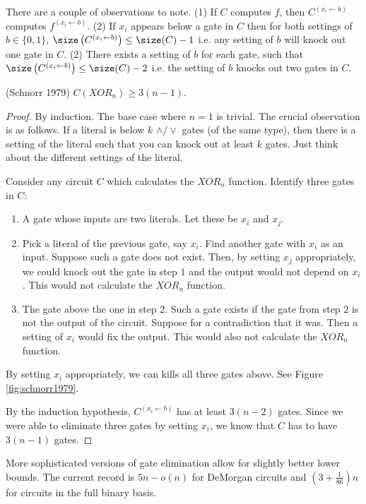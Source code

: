 There are a couple of observations to note. (1) If $C$ computes $f$, then $C^{(x_i \leftarrow b)}$ computes $f^{(x_i \leftarrow b)}$. (2) If $x_i$ appears below a gate in $C$ then for both settings of $b \in \{0,1\}$, $\size\left(C^{(x_i \leftarrow b)}\right) \leq \size(C) - 1$ i.e. any setting of $b$ will knock out one gate in $C$. (2) There exists a setting of $b$ for each gate, such that $\size\left(C^{(x_i \leftarrow b)}\right) \leq \size(C) - 2$ i.e. the setting of $b$ knocks out two gates in $C$.

\begin{theorem}
	\label{thm:schnorr1979-XORlb}
	(Schnorr 1979) $C(XOR_n) \geq 3(n-1)$.
\end{theorem}
\begin{proof}
	By induction. The base case where $n = 1$ is trivial. The crucial observation is as follows. If a literal is below $k$ $\land/\lor$ gates (of the same type), then there is a setting of the literal such that you can knock out at least $k$ gates. Just think about the different settings of the literal.
	
	Consider any circuit $C$ which calculates the $XOR_n$ function. Identify three gates in $C$:
	\begin{enumerate}
		\item A gate whose inputs are two literals. Let these be $x_i$ and $x_j$. 
		\item Pick a literal of the previous gate, say $x_i$. Find another gate with $x_i$ as an input. Suppose such a gate does not exist. Then, by setting $x_j$ appropriately, we could knock out the gate in step $1$ and the output would not depend on $x_i$. This would not calculate the $XOR_n$ function.
		\item The gate above the one in step 2. Such a gate exists if the gate from step $2$ is not the output of the circuit. Suppose for a contradiction that it was. Then a setting of $x_i$ would fix the output. This would also not calculate the $XOR_n$ function.
	\end{enumerate}  
	By setting $x_i$ appropriately, we can kills all three gates above. See Figure \ref{fig:schnorr1979}.
	
	
	By the induction hypothesis, $C^{(x_i \leftarrow b)}$ has at least $3(n - 2)$ gates. Since we were able to eliminate three gates by setting $x_i$, we know that $C$ has to have $3(n-1)$ gates.  
\end{proof}
More sophisticated versions of gate elimination allow for slightly better lower bounds. The current record is $5n - o(n)$ for DeMorgan circuits and $\left(3 + \frac{1}{86}\right)n$ for circuits in the full binary basis. 

